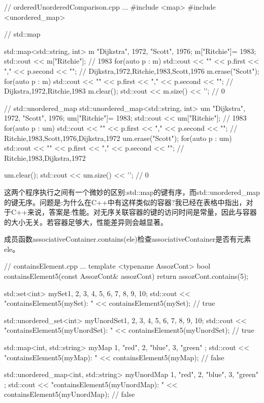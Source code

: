 
\begin{cpp}
// orderedUnorderedComparison.cpp
...
#include <map>
#include <unordered_map>

// std::map

std::map<std::string, int> m {{"Dijkstra", 1972}, {"Scott", 1976}};
m["Ritchie"]= 1983;
std::cout << m["Ritchie"]; // 1983
for(auto p : m) std::cout << "{" << p.first << "," << p.second << "}";
							// {Dijkstra,1972},{Ritchie,1983},{Scott,1976}
m.erase("Scott");
for(auto p : m) std::cout << "{" << p.first << "," << p.second << "}";
								// {Dijkstra,1972},{Ritchie,1983}
m.clear();
std::cout << m.size() << '\n'; // 0

// std::unordered_map
std::unordered_map<std::string, int> um {{"Dijkstra", 1972}, {"Scott", 1976}};
um["Ritchie"]= 1983;
std::cout << um["Ritchie"]; // 1983
for(auto p : um) std::cout << "{" << p.first << "," << p.second << "}";
								// {Ritchie,1983},{Scott,1976},{Dijkstra,1972}
um.erase("Scott");
for(auto p : um) std::cout << "{" << p.first << "," << p.second << "}";
								// {Ritchie,1983},{Dijkstra,1972}

um.clear();
std::cout << um.size() << '\n'; // 0
\end{cpp}

这两个程序执行之间有一个微妙的区别:std::map的键有序，而std::unordered\_map的键无序。问题是:为什么在C++中有这样类似的容器?我已经在表格中指出，对于C++来说，答案是:性能。对无序关联容器的键的访问时间是常量，因此与容器的大小无关。若容器足够大，性能差异则会越显著。


成员函数associativeContainer.contains(ele)检查associativeContainer是否有元素ele。


\begin{cpp}
// containsElement.cpp
...
template <typename AssozCont>
bool containsElement5(const AssozCont& assozCont) {
	return assozCont.contains(5);
}

std::set<int> mySet{1, 2, 3, 4, 5, 6, 7, 8, 9, 10};
std::cout << "containsElement5(mySet): "
		  << containsElement5(mySet); // true

std::unordered_set<int> myUnordSet{1, 2, 3, 4, 5, 6, 7, 8, 9, 10};
std::cout << "containsElement5(myUnordSet): "
		  << containsElement5(myUnordSet); // true

std::map<int, std::string> myMap{ {1, "red"}, {2, "blue"}, {3, "green"} };
std::cout << "containsElement5(myMap): "
		  << containsElement5(myMap); // false

std::unordered_map<int, std::string> myUnordMap{ {1, "red"}, {2, "blue"},
												 {3, "green"} };
std::cout << "containsElement5(myUnordMap): "
		  << containsElement5(myUnordMap); // false
\end{cpp}


